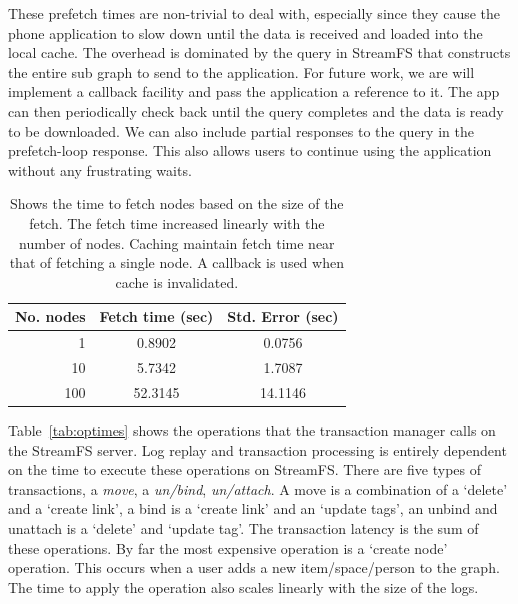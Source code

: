 These prefetch times are non-trivial to deal with, especially since they cause the phone application to slow down
until the data is received and loaded into the local cache.  The overhead is dominated by the query in StreamFS that 
constructs the entire sub graph to send to the application.  For future work,  we are will implement a
callback facility and pass the application a reference to it.  The app can then periodically check back until
the query completes and the data is ready to be downloaded.  We can also include partial responses to the query
in the prefetch-loop response.  This also allows users to continue using the application without any frustrating waits.

\begin{table}
\begin{center}
  \begin{tabular}{| r | c  c | }
    \hline
    \textbf{No. nodes} & \textbf{Fetch time (sec)} & \textbf{Std. Error (sec)} \\ \hline
    1       &   0.8902      & 0.0756 \\ \hline
    10      &   5.7342      & 1.7087 \\ \hline
    100     &   52.3145     & 14.1146 \\ 
    \hline
  \end{tabular}
\caption{Shows the time to fetch nodes based on the size of the fetch.  The fetch time
increased linearly with the number of nodes.  Caching maintain fetch time near
that of fetching a single node.  A callback is used when cache is invalidated.}
\label{tab:prefetchtimes}
\end{center}
\end{table}


Table~\ref{tab:optimes} shows the  operations that the transaction manager calls on the StreamFS server.
Log replay and transaction processing is entirely dependent on the time to execute these operations on StreamFS.
There are five types of transactions, a \emph{move}, a \emph{un/bind}, \emph{un/attach}.  A move is a combination
of a `delete' and a `create link', a bind is a `create link' and an `update tags', an unbind and unattach is a
`delete' and `update tag'.  The transaction latency is the sum of these operations.  By far the most expensive
operation is a `create node' operation.  This occurs when a user adds a new item/space/person to the graph.
The time to apply the operation also scales linearly with the size of the logs.  

